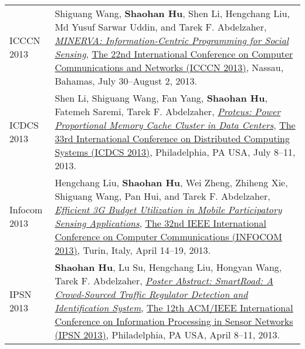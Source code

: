 \begin{longtabu}{p{.51\sectionwidth} p{.78\resumewidth}}

{\sc ICCCN 2013}\hypertarget{wang2013icccn}{} &
Shiguang Wang, \textbf{Shaohan Hu}, Shen Li, Hengchang Liu, Md Yusuf Sarwar Uddin, and Tarek F. Abdelzaher,
\href{http://ieeexplore.ieee.org/document/6614152}{\emph{MINERVA: Information-Centric Programming for Social Sensing}},
\href{http://www.icccn.org/icccn13/}{\textsf{The 22nd International Conference on Computer Communications and Networks (ICCCN 2013)}},
Nassau, Bahamas, July 30--August 2, 2013. \\

{\sc ICDCS 2013}\hypertarget{li2013icdcs}{} &
Shen Li, Shiguang Wang, Fan Yang, \textbf{Shaohan Hu}, Fatemeh Saremi, Tarek F. Abdelzaher,
\href{http://ieeexplore.ieee.org/document/6681577}{\emph{Proteus: Power Proportional Memory Cache Cluster in Data Centers}},
\href{http://www.temple.edu/cis/icdcs2013/}{\textsf{The 33rd International Conference on Distributed Computing Systems (ICDCS 2013)}},
Philadelphia, PA USA, July 8--11, 2013. \\


{\sc Infocom 2013}\hypertarget{liu2013infocom}{} &
Hengchang Liu, \textbf{Shaohan Hu}, Wei Zheng, Zhiheng Xie, Shiguang Wang, Pan Hui, and Tarek F. Abdelzaher,
\href{http://ieeexplore.ieee.org/document/6566935}{\emph{Efficient 3G Budget Utilization in Mobile Participatory Sensing Applications}},
\href{http://infocom2013.ieee-infocom.org/}{\textsf{The 32nd IEEE International Conference on Computer Communications (INFOCOM 2013)}},
Turin, Italy, April 14--19, 2013. \\

{\sc IPSN 2013}\hypertarget{hu2013ipsn}{} &
\textbf{Shaohan Hu}, Lu Su, Hengchang Liu, Hongyan Wang, Tarek F. Abdelzaher,
\href{http://portal.acm.org/citation.cfm?id=2461433}{\emph{Poster Abstract: SmartRoad: A Crowd-Sourced Traffic Regulator Detection and Identification System}},
\href{http://ipsn.acm.org/2013/}{\textsf{The 12th ACM/IEEE International Conference on Information Processing in Sensor Networks (IPSN 2013)}},
Philadelphia, PA USA, April 8--11, 2013. \\


\end{longtabu}
